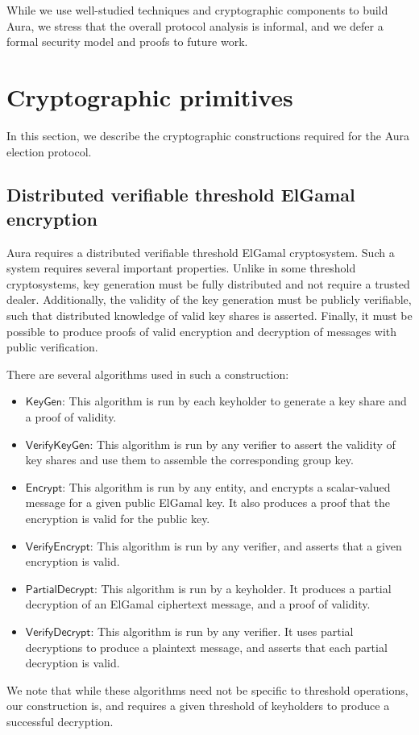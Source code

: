 \documentclass{article}
\newcommand{\func}[1]{\mathsf{#1}}
\begin{document}
While we use well-studied techniques and cryptographic components to build Aura, we stress that the overall protocol analysis is informal, and we defer a formal security model and proofs to future work.


\section{Cryptographic primitives}

In this section, we describe the cryptographic constructions required for the Aura election protocol.


\subsection{Distributed verifiable threshold ElGamal encryption}

Aura requires a distributed verifiable threshold ElGamal cryptosystem.
Such a system requires several important properties.
Unlike in some threshold cryptosystems, key generation must be fully distributed and not require a trusted dealer.
Additionally, the validity of the key generation must be publicly verifiable, such that distributed knowledge of valid key shares is asserted.
Finally, it must be possible to produce proofs of valid encryption and decryption of messages with public verification.

There are several algorithms used in such a construction:
\begin{itemize}
    \item $\func{KeyGen}$: This algorithm is run by each keyholder to generate a key share and a proof of validity.
    \item $\func{VerifyKeyGen}$: This algorithm is run by any verifier to assert the validity of key shares and use them to assemble the corresponding group key.
    \item $\func{Encrypt}$: This algorithm is run by any entity, and encrypts a scalar-valued message for a given public ElGamal key.
    It also produces a proof that the encryption is valid for the public key.
    \item $\func{VerifyEncrypt}$: This algorithm is run by any verifier, and asserts that a given encryption is valid.
    \item $\func{PartialDecrypt}$: This algorithm is run by a keyholder.
    It produces a partial decryption of an ElGamal ciphertext message, and a proof of validity.
    \item $\func{VerifyDecrypt}$: This algorithm is run by any verifier.
    It uses partial decryptions to produce a plaintext message, and asserts that each partial decryption is valid.
\end{itemize}
We note that while these algorithms need not be specific to threshold operations, our construction is, and requires a given threshold of keyholders to produce a successful decryption.
\end{document}
